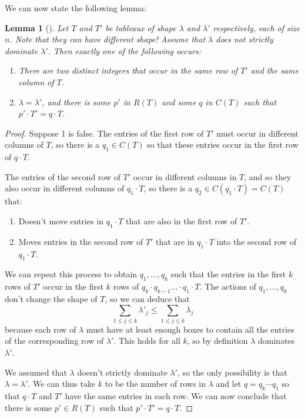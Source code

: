 \documentclass[12pt,twoside]{reedthesis}
\theoremstyle{plain}   %
\newtheorem{lemma}{Lemma}[section]
\theoremstyle{definition}
\theoremstyle{remark}
\numberwithin{equation}{section}
\begin{document}
  We can now state the following lemma:
  \begin{lemma}[{\cite[Lemma 7.1]{fulton}}] \label{lem1}
    Let $T$ and $T'$ be tableaux of shape $\lambda$ and $\lambda'$ respectively, each of size $n$. Note that they can have different shape!
    Assume that $\lambda$ does not strictly dominate $\lambda'$.
    Then exactly one of the following occurs:
    \begin{enumerate}
    \item There are two distinct integers that occur in the same row of $T'$ and the same column of $T$.
    \item $\lambda = \lambda'$, and there is some $p'$ in $R(T)$ and some $q$ in $C(T)$ such that $p' \cdot T' = q \cdot T$.
    \end{enumerate}
  \end{lemma}
  \begin{proof}
    Suppose 1 is false. The entries of the first row of $T'$ must occur in different columns of $T$,
    so there is a $q_1 \in C(T)$ so that these entries occur in the first row of $q \cdot T$.\par
    The entries of the second row of $T'$ occur in different columns in $T$, and so they also occur in different columns of $q_1 \cdot T$,
    so there is a $q_2 \in C(q_1 \cdot T) = C(T)$ that:
    \begin{enumerate}
    \item Doesn't move entries in $q_1 \cdot T$ that are also in the first row of $T'$.
    \item Moves entries in the second row of $T'$ that are in $q_1 \cdot T$
      into the second row of $q_1 \cdot T$.
    \end{enumerate}
    We can repeat this process to obtain $q_1, \dots, q_k$ such that the entries in the first $k$ rows of $T'$ occur in the first $k$ rows of
    $q_k \cdot q_{k-1} \dots \cdot q_1 \cdot T$. The actions of $q_1, \dots, q_k$ don't change the shape of $T$, so we can deduce that
    \[\sum_{1 \leq j \leq k} \lambda'_j \leq \sum_{1 \leq j \leq k} \lambda_j\]
    because each row of $\lambda$ must have at least enough boxes to contain all the entries of the corresponding row of $\lambda'$.
    This holds for all $k$, so by definition $\lambda$ dominates $\lambda'$. \par
    We assumed that $\lambda$ doesn't strictly dominate $\lambda'$, so the only possibility is that $\lambda = \lambda'$.
    We can thus take $k$ to be the number of rows in $\lambda$ and let $q = q_k \cdots q_1$ so that
    $q \cdot T$ and $T'$ have the same entries in each row.
    We can now conclude that there is some $p' \in R(T)$ such that $p' \cdot T' = q \cdot T$.
  \end{proof}
\end{document}
